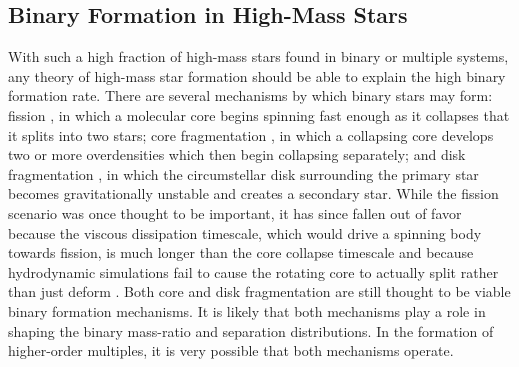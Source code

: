 \subsection{Binary Formation in High-Mass Stars}
\label{paper1_sec:formation}
With such a high fraction of high-mass stars found in binary or multiple
systems, any theory of high-mass star formation should be able to
explain the high binary formation rate. There are several mechanisms by
which binary stars may form: fission \citep{Lyttleton1953,
  Lebovitz1974, Lebovitz1984}, in which a molecular core begins
spinning fast enough as it collapses that it splits into two stars;
core fragmentation \citep[see e.g.][]{Boss1979, Boss1986, Bate1995}, in which a collapsing core develops two or more
overdensities which then begin collapsing separately; and disk
fragmentation \citep[see e.g.][]{Kratter2006, Stamatellos2011}, in which the circumstellar disk surrounding the primary
star becomes gravitationally unstable and creates a secondary
star. While the fission scenario was once thought to be important, it
has since fallen out of favor because the viscous dissipation timescale, which would drive a spinning body towards fission, is much longer than the core collapse timescale \citep{Tohline2002} and because hydrodynamic simulations fail to cause
the rotating core to actually split rather than just deform
\citep{Tohline2001}. Both core and disk fragmentation are still
thought to be viable binary formation mechanisms. It is likely that
both mechanisms play a role in shaping the binary mass-ratio and
separation distributions. In the formation of higher-order multiples, it is very possible that both mechanisms operate.

